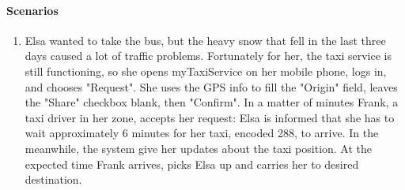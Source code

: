 	\paragraph{Scenarios}
		\begin{enumerate}
			\item Elsa wanted to take the bus, but the heavy snow that fell in the last three days caused a lot of traffic problems. Fortunately for her, the taxi service is still functioning, so she opens myTaxiService on her mobile phone, logs in, and chooses "Request".
			She uses the GPS info to fill the "Origin" field, leaves the "Share" checkbox blank, then "Confirm". In a matter of minutes Frank, a taxi driver in her zone, accepts her request: Elsa is informed that she has to wait approximately 6 minutes for her taxi, encoded 288, to arrive. In the meanwhile, the system give her updates about the taxi position. At the expected time Frank arrives, picks Elsa up and carries her to desired destination.
		\end{enumerate}
	

